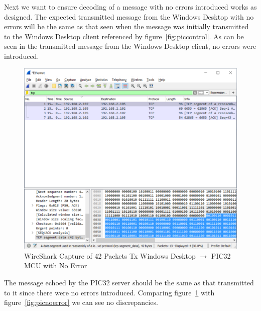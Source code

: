 \documentclass[12pt]{article}
\begin{document}
Next we want to ensure decoding of a message with no errors introduced 
works as designed. The expected transmitted message from the 
Windows Desktop with no errors will be the same
as that seen when the message was initially transmitted to the Windows Desktop
client referenced by figure~\ref{fig:piccontrol}. As can be seen 
in the transmitted message from the Windows Desktop client, no errors were 
introduced.

\begin{figure}[H]
    \centering
    \includegraphics[width=5.5in]{images/wireshark_vbtx_noerror_packets.PNG}
    \caption{WireShark Capture of 42 Packets Tx 
        Windows Desktop $\rightarrow$ PIC32 MCU with No Error}
    \label{fig:vbnoerror}
\end{figure}

The message echoed by the PIC32 server should be the same as that transmitted
to it since there were no errors introduced. Comparing figure~\ref{fig:vbnoerror} 
with figure~\ref{fig:picnoerror} we can see no discrepancies. 
\end{document}
